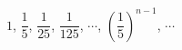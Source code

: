 $1$, $\dfrac{1}{5}$, $\dfrac{1}{25}$, $\dfrac{1}{125}$, $\cdots$, $\left(\dfrac{1}{5}\right)^{n-1}$, $\cdots$

